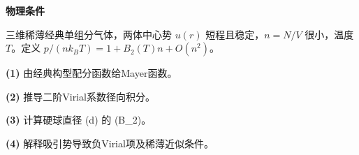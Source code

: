 \textbf{物理条件}\par 三维稀薄经典单组分气体，两体中心势 \(u(r)\) 短程且稳定，\(n=N/V\) 很小，温度 \(T\)。定义 \(p/(nk_BT)=1+B_2(T)n+O(n^2)\)。
\par\noindent\textbf{(1)} 由经典构型配分函数给Mayer函数。
\par\noindent\textbf{(2)} 推导二阶Virial系数径向积分。
\par\noindent\textbf{(3)} 计算硬球直径 (d) 的 (B\_2)。
\par\noindent\textbf{(4)} 解释吸引势导致负Virial项及稀薄近似条件。
